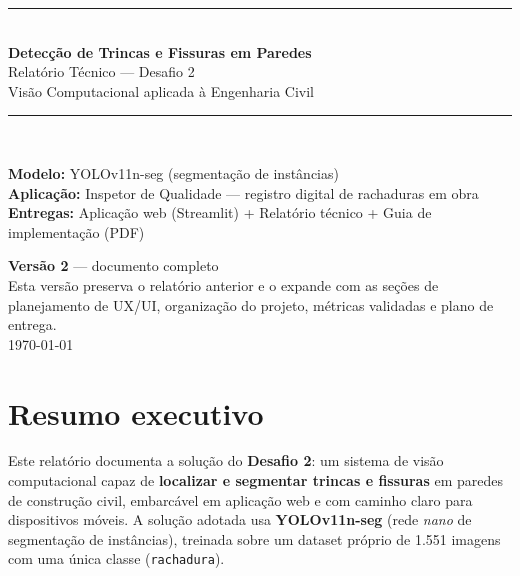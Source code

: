 \documentclass[11pt,a4paper]{article}
\begin{document}
\begin{titlepage}
\centering
\vspace*{1.5cm}
{\color{primary}\rule{\linewidth}{1.5pt}}\\[0.6cm]
{\Huge\bfseries\color{primary} Detecção de Trincas e Fissuras em Paredes}\\[0.35cm]
{\LARGE\color{accent} Relatório Técnico — Desafio 2}\\[0.25cm]
{\large\color{graytxt} Visão Computacional aplicada à Engenharia Civil}\\[0.4cm]
{\color{primary}\rule{\linewidth}{1.5pt}}\\[1.2cm]

\begin{infobox}
\centering
\textbf{Modelo:} YOLOv11n-seg (segmentação de instâncias) \\[2pt]
\textbf{Aplicação:} Inspetor de Qualidade — registro digital de rachaduras em obra \\[2pt]
\textbf{Entregas:} Aplicação web (Streamlit) + Relatório técnico + Guia de implementação (PDF)
\end{infobox}

\vfill
{\large \textbf{Versão 2} — documento completo}\\[4pt]
{\color{graytxt} Esta versão preserva o relatório anterior e o expande com as seções de
planejamento de UX/UI, organização do projeto, métricas validadas e plano de entrega.}\\[1cm]
{\color{graytxt} \today}
\end{titlepage}

\tableofcontents
\newpage

\section{Resumo executivo}
Este relatório documenta a solução do \textbf{Desafio 2}: um sistema de visão
computacional capaz de \textbf{localizar e segmentar trincas e fissuras} em paredes de
construção civil, embarcável em aplicação web e com caminho claro para dispositivos móveis.
A solução adotada usa \textbf{YOLOv11n-seg} (rede \emph{nano} de segmentação de instâncias),
treinada sobre um dataset próprio de 1.551 imagens com uma única classe (\texttt{rachadura}).
\end{document}
